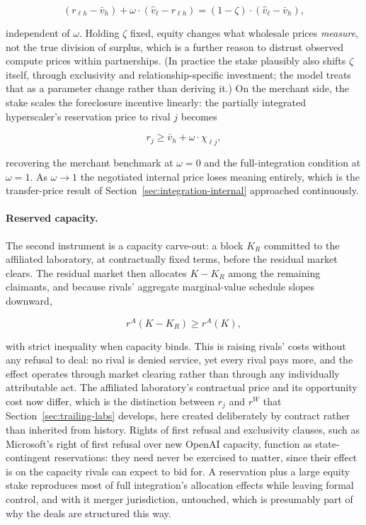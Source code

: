 \documentclass[11pt]{article}
\begin{document}
\begin{equation}\left(r_{\ell h}-\bar v_h\right)+\omega\cdot\left(\widehat v_\ell-r_{\ell h}\right)=\left(1-\zeta\right)\cdot\left(\widehat v_\ell-\bar v_h\right),\end{equation}

independent of $\omega$. Holding $\zeta$ fixed, equity changes what wholesale prices \emph{measure}, not the true division of surplus, which is a further reason to distrust observed compute prices within partnerships. (In practice the stake plausibly also shifts $\zeta$ itself, through exclusivity and relationship-specific investment; the model treats that as a parameter change rather than deriving it.) On the merchant side, the stake scales the foreclosure incentive linearly: the partially integrated hyperscaler's reservation price to rival $j$ becomes

\begin{equation}r_j\geq\bar v_h+\omega\cdot\chi_{\ell j},\end{equation}

recovering the merchant benchmark at $\omega=0$ and the full-integration condition at $\omega=1$. As $\omega\rightarrow1$ the negotiated internal price loses meaning entirely, which is the transfer-price result of Section~\ref{sec:integration-internal} approached continuously.

\paragraph{Reserved capacity.} The second instrument is a capacity carve-out: a block $K_R$ committed to the affiliated laboratory, at contractually fixed terms, before the residual market clears. The residual market then allocates $K-K_R$ among the remaining claimants, and because rivals' aggregate marginal-value schedule slopes downward,

\begin{equation}r^A(K-K_R)\geq r^A(K),\end{equation}

with strict inequality when capacity binds. This is raising rivals' costs without any refusal to deal: no rival is denied service, yet every rival pays more, and the effect operates through market clearing rather than through any individually attributable act. The affiliated laboratory's contractual price and its opportunity cost now differ, which is the distinction between $r_j$ and $r^W$ that Section~\ref{sec:trailing-labs} develops, here created deliberately by contract rather than inherited from history. Rights of first refusal and exclusivity clauses, such as Microsoft's right of first refusal over new OpenAI capacity, function as state-contingent reservations: they need never be exercised to matter, since their effect is on the capacity rivals can expect to bid for. A reservation plus a large equity stake reproduces most of full integration's allocation effects while leaving formal control, and with it merger jurisdiction, untouched, which is presumably part of why the deals are structured this way.
\end{document}
